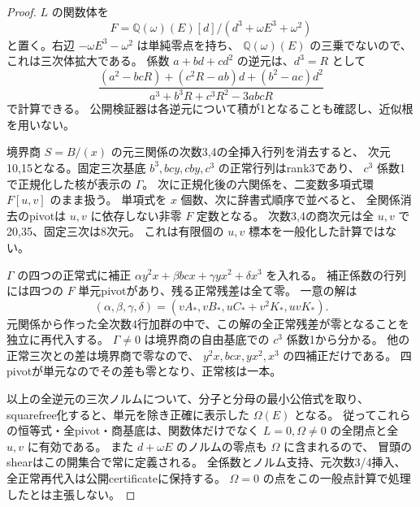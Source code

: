 \begin{proof}
$L$ の関数体を
\[
 F=\mathbb Q(\omega)(E)[d]/(d^3+\omega E^3+\omega^2)
\]
と置く。右辺 $-\omega E^3-\omega^2$ は単純零点を持ち、
$\mathbb Q(\omega)(E)$ の三乗でないので、これは三次体拡大である。
係数 $a+bd+cd^2$ の逆元は、$d^3=R$ として
\[
 \frac{(a^2-bcR)+(c^2R-ab)d+(b^2-ac)d^2}
 {a^3+b^3R+c^3R^2-3abcR}
\]
で計算できる。
公開検証器は各逆元について積が1となることも確認し、近似根を用いない。

境界商 $S=B/(x)$ の元三関係の次数3,4の全挿入行列を消去すると、
次元10,15となる。固定三次基底 $b^3,bcy,cby,c^3$ の正常行列はrank3であり、
$c^3$ 係数1で正規化した核が表示の $\Gamma$。
次に正規化後の六関係を、二変数多項式環 $F[u,v]$ のまま扱う。
単項式を $x$ 個数、次に辞書式順序で並べると、
全関係消去のpivotは $u,v$ に依存しない非零 $F$ 定数となる。
次数3,4の商次元は全 $u,v$ で20,35、固定三次は8次元。
これは有限個の $u,v$ 標本を一般化した計算ではない。

$\Gamma$ の四つの正常式に補正
$\alpha y^2x+\beta bcx+\gamma yx^2+\delta x^3$ を入れる。
補正係数の行列には四つの $F$ 単元pivotがあり、残る正常残差は全て零。
一意の解は
\[
 (\alpha,\beta,\gamma,\delta)
 =(vA_*,vB_*,uC_*+v^2K_*,uvK_*).
\]
元関係から作った全次数4行加群の中で、この解の全正常残差が零となることを独立に再代入する。
$\Gamma\ne0$ は境界商の自由基底での $c^3$ 係数1から分かる。
他の正常三次との差は境界商で零なので、
$y^2x,bcx,yx^2,x^3$ の四補正だけである。
四pivotが単元なのでその差も零となり、正常核は一本。

以上の全逆元の三次ノルムについて、分子と分母の最小公倍式を取り、
squarefree化すると、単元を除き正確に表示した $\Omega(E)$ となる。
従ってこれらの恒等式・全pivot・商基底は、関数体だけでなく
$L=0,\Omega\ne0$ の全閉点と全 $u,v$ に有効である。
また $d+\omega E$ のノルムの零点も $\Omega$ に含まれるので、
冒頭のshearはこの開集合で常に定義される。
全係数とノルム支持、元次数3/4挿入、全正常再代入は公開certificateに保持する。
$\Omega=0$ の点をこの一般点計算で処理したとは主張しない。
\end{proof}
